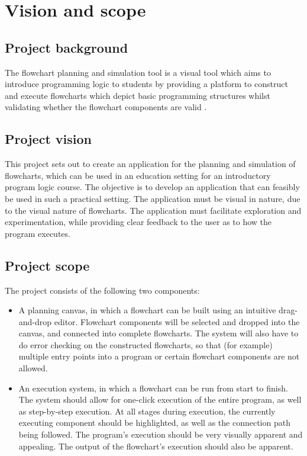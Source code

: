 \documentclass[11pt,a4paper,titlepage]{article}
\begin{document}


\newpage
\tableofcontents


\pagebreak

\section{Vision and scope}
\subsection{Project background}
The flowchart planning and simulation  tool is a visual tool which aims to introduce programming logic to students by providing  a platform to construct  and execute  flowcharts which depict basic programming structures whilst validating whether the flowchart components are valid .

\subsection{Project vision}

This project sets out to create an application for the planning and simulation of flowcharts, which
can be used in an education setting for an introductory program logic course. The objective is to
develop an application that can feasibly be used in such a practical setting. The application must be
visual in nature, due to the visual nature of flowcharts. The application must facilitate exploration
and experimentation, while providing clear feedback to the user as to how the program executes.

\subsection{Project scope}

The project consists of the following two components:

\begin{itemize}
\item A planning canvas, in which a flowchart can be built using an intuitive drag-and-drop editor.
Flowchart components will be selected and dropped into the canvas, and connected into
complete flowcharts. The system will also have to do error checking on the constructed
flowcharts, so that (for example) multiple entry points into a program or certain flowchart
components are not allowed.
\item An execution system, in which a flowchart can be run from start to finish. The system
should allow for one-click execution of the entire program, as well as step-by-step
execution. At all stages during execution, the currently executing component should be
highlighted, as well as the connection path being followed. The program's execution should
be very visually apparent and appealing. The output of the flowchart's execution should also
be apparent.
\end{itemize}
\end{document}
